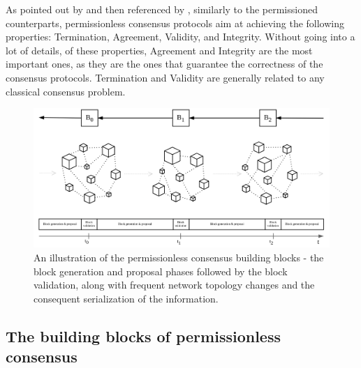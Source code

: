 \documentclass[journal]{IEEEtran}
\begin{document}
As pointed out by \cite{xiao2019distributed, 8629877} and then referenced by \cite{survey-dist-consensus}, 
similarly to the permissioned counterparts, permissionless consensus protocols 
aim at achieving the following properties: Termination, Agreement, Validity, 
and Integrity. Without going into a lot of details, of these properties, 
Agreement and Integrity are the most important ones, as they are the ones that
guarantee the correctness of the consensus protocols. Termination and Validity
are generally related to any classical consensus problem.

\begin{figure}[h]
  \centering
  \includegraphics[width=\columnwidth]{building-blocks-consensus.png}
  \caption{An illustration of the permissionless consensus building blocks - 
  the block generation and proposal phases followed by the block validation, 
  along with frequent network topology changes and the consequent serialization of the information.}
  \label{fig:building-blocks-consensus}
\end{figure}

\subsection{The building blocks of permissionless consensus}
\end{document}
